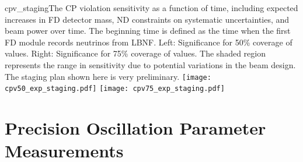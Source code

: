 \begin{cdrfigure}{cpv_staging}{The CP violation sensitivity as a function of time, including expected increases in FD detector mass, ND constraints on systematic uncertainties, and beam power over time.  The beginning time is defined as the time when the first FD module records neutrinos from LBNF.  Left: Significance for 50\% coverage of \deltacp values.  Right: Significance for 75\% coverage of \deltacp values.  The shaded region represents the range in sensitivity due to potential variations in the beam design.  The staging plan shown here is very preliminary.}
 \texttt{[image: cpv50\_exp\_staging.pdf]}
 \texttt{[image: cpv75\_exp\_staging.pdf]}
\end{cdrfigure}

\section{Precision Oscillation Parameter Measurements}

